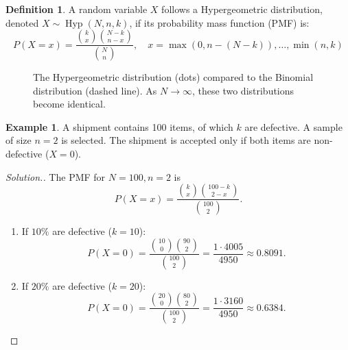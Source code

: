 \documentclass[12pt,a4paper]{report}
\theoremstyle{definition}
\newtheorem{definition}[thm]{Definition}
\newtheorem{example}[thm]{Example}
\theoremstyle{plain}
\theoremstyle{definition}
\newenvironment{solution}
  {\renewcommand{\qedsymbol}{}\begin{proof}[\textit{Solution}.]}
  {\end{proof}}
\begin{document}
\begin{definition}
A random variable $X$ follows a Hypergeometric distribution, denoted $X \sim \operatorname{Hyp}(N, n, k)$, if its probability mass function (PMF) is: \[ P(X=x) = \frac{\binom{k}{x}\binom{N-k}{n-x}}{\binom{N}{n}}, \quad x = \max(0, n-(N-k)), \dots, \min(n, k)\]
\end{definition}
\begin{figure}[H]
    \centering
    \caption{The Hypergeometric distribution (dots) compared to the Binomial distribution (dashed line). As $N \to \infty$, these two distributions become identical.}
\end{figure}


\begin{example}
A shipment contains 100 items, of which $k$ are defective. A sample of size $n=2$ is selected. The shipment is accepted only if both items are non-defective ($X=0$).
\end{example}

\begin{solution}The PMF for $N=100, n=2$ is \[P(X=x) = \frac{\binom{k}{x}\binom{100-k}{2-x}}{\binom{100}{2}}.\]\begin{enumerate}
\item[(i)] If $10\%$ are defective ($k=10$):\[ P(X=0) = \frac{\binom{10}{0}\binom{90}{2}}{\binom{100}{2}} = \frac{1 \cdot 4005}{4950} \approx 0.8091. \]
\item[(ii)] If $20\%$ are defective ($k=20$):\[ P(X=0) = \frac{\binom{20}{0}\binom{80}{2}}{\binom{100}{2}} = \frac{1 \cdot 3160}{4950} \approx 0.6384. \]
\end{enumerate}
\end{solution}
\end{document}
